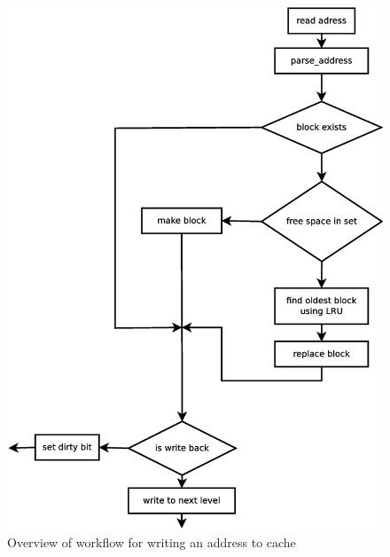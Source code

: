 \documentclass[11pt]{article}
\begin{document}
\begin{figure}[htp!]
\centering
\includegraphics[scale=0.40]{write_diagram.eps}
\caption{Overview of workflow for writing an address to cache}
\label{}
\end{figure}
\end{document}
